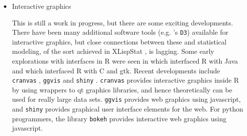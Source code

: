 \documentclass{article}
\begin{document}
\begin{itemize}
\item Interactive graphics

This is still a work in progress, but there are some exciting developments. There have been many additional software tools (e.g. \citet{Bostock:2011}'s  {\tt D3}) available for interactive graphics, but close connections between these and statistical modeling, of the sort achieved in XLispStat \citep{Ti91}, is lagging. Some early explorations with interfaces in R were seen in \citet{iplots} which interfaced R with Java and \citet{rggobi-rnews} which interfaced R with C and gtk. Recent developments include {\tt cranvas} \citep{xie2014reactive}, {\tt ggvis} \citep{ggvis} and {\tt shiny} \citep{shiny}.  {\tt cranvas} provides interactive graphics inside R by using wrappers to qt graphics libraries, and hence theoretically can be used for really large data sets. {\tt ggvis} provides web graphics using javascript, and {\tt shiny}  provides graphical user interface elements for the web. For python programmers, the library {\tt bokeh} \citep{bokeh} provides interactive web graphics using javascript.

\end{itemize}

\end{document}
